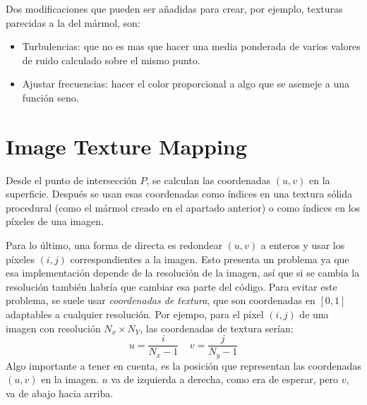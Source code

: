 Dos modificaciones que pueden ser añadidas para crear, por ejemplo, texturas parecidas a la del mármol, son:

\begin{itemize}
\item Turbulencias: que no es mas que hacer una media ponderada de varios valores de ruido calculado sobre el mismo punto.
\item Ajustar frecuencias: hacer el color proporcional a algo que se asemeje a una función seno.
\end{itemize}

\section{Image Texture Mapping}

Desde el punto de intersección $P$, se calculan las coordenadas $(u,v)$ en la superficie. Después se usan esas coordenadas como índices en una textura sólida procedural (como el mármol creado en el apartado anterior) o como índices en los píxeles de una imagen.

Para lo último, una forma de directa es redondear $(u,v)$ a enteros y usar los píxeles $(i,j)$ correspondientes a la imagen. Esto presenta un problema ya que esa implementación depende de la resolución de la imagen, así que si se cambia la resolución también habría que cambiar esa parte del código. Para evitar este problema, se suele usar \textit{coordenadas de textura}, que son coordenadas en $[0,1]$  adaptables a cualquier resolución. Por ejempo, para el píxel $(i,j)$ de una imagen con resolución $N_x\times N_Y$, las coordenadas de textura serían:
\[
u=\frac{i}{N_x-1} \;\;\;\; v=\frac{j}{N_y-1}
\]
Algo importante a tener en cuenta, es la posición que representan las coordenadas $(u,v)$ en la imagen. $u$ va de izquierda a derecha, como era de esperar, pero $v$, va de abajo hacia arriba.

